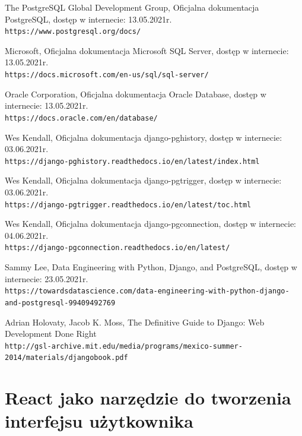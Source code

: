 \documentclass[oneside,polski,logo,indent]{amuthesis}
\begin{document}
\begin{enumerate}
\begin{enumerate}
\begin{thebibliography}{9}
The PostgreSQL Global Development Group, Oficjalna dokumentacja PostgreSQL, dostęp w internecie: 13.05.2021r.
\\\texttt{https://www.postgresql.org/docs/}


Microsoft, Oficjalna dokumentacja Microsoft SQL Server, dostęp w internecie: 13.05.2021r.
\\\texttt{https://docs.microsoft.com/en-us/sql/sql-server/}


Oracle Corporation, Oficjalna dokumentacja Oracle Database, dostęp w internecie: 13.05.2021r.
\\\texttt{https://docs.oracle.com/en/database/}


Wes Kendall, Oficjalna dokumentacja django-pghistory, dostęp w internecie: 03.06.2021r.
\\\texttt{https://django-pghistory.readthedocs.io/en/latest/index.html}


Wes Kendall, Oficjalna dokumentacja django-pgtrigger, dostęp w internecie: 03.06.2021r.
\\\texttt{https://django-pgtrigger.readthedocs.io/en/latest/toc.html}


Wes Kendall, Oficjalna dokumentacja django-pgconnection, dostęp w internecie: 04.06.2021r.
\\\texttt{https://django-pgconnection.readthedocs.io/en/latest/}


Sammy Lee, Data Engineering with Python, Django, and PostgreSQL, dostęp w internecie: 23.05.2021r.
\\\texttt{https://towardsdatascience.com/data-engineering-with-python-django-and-postgresql-99409492769}

Adrian Holovaty, Jacob K. Moss, The Definitive Guide to Django:
Web Development Done Right
\\\texttt{http://gsl-archive.mit.edu/media/programs/mexico-summer-2014/materials/djangobook.pdf}
\end{thebibliography}


\chapter {React jako narzędzie do tworzenia interfejsu użytkownika}


\end{enumerate}
\end{enumerate}
\end{document}
